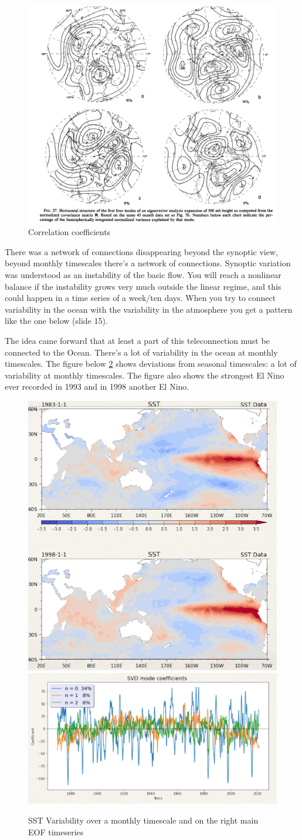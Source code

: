 \begin{figure}[htp!]
	\centering
	\includegraphics[width=0.4\linewidth]{uploads/Screenshot 2024-11-15 155150.png}
	\caption{Correlation coefficients}
	\label{fig:correlation coeff}
\end{figure}
There was a network of connections disappearing beyond the synoptic view, beyond monthly timescales there's a network of connections. Synoptic variation was understood as an instability of the basic flow. You will reach a nonlinear balance if the instability grows very much outside the linear regime, and this could happen in a time series of a week/ten days.
When you try to connect variability in the ocean with the variability in the atmosphere you get a pattern like the one below (slide 15).

The idea came forward that at least a part of this teleconnection must be connected to the Ocean. There's a lot of variability in the ocean at monthly timescales. The figure below \ref{fig:SST VAR} shows deviations from seasonal timescales: a lot of variability at monthly timescales. The figure also shows the strongest El Nino ever recorded in 1993 and in 1998 another El Nino.
\begin{figure}[htpb]
	\centering
	\includegraphics[width=0.35\linewidth]{uploads/Screenshot 2024-11-18 164612.png}\quad \includegraphics[width=0.5\linewidth]{uploads/Screenshot 2024-11-18 164205.png}
	\caption{SST Variability over a monthly timescale and on the right main EOF timeseries}
	\label{fig:SST VAR}
\end{figure}



